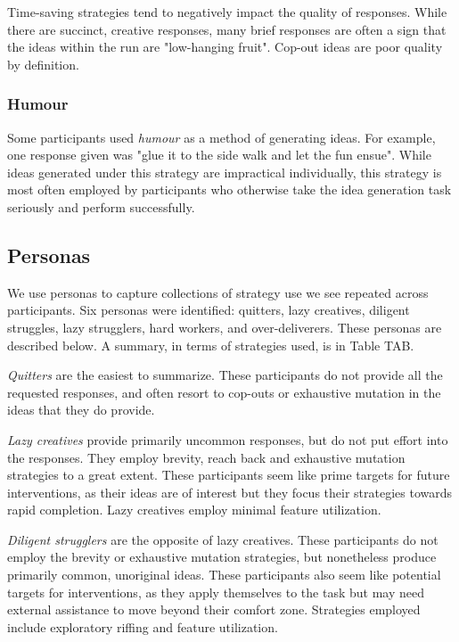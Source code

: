Time-saving strategies tend to negatively impact the quality of responses. While there are succinct, creative responses, many brief responses are often a sign that the ideas within the run are "low-hanging fruit". Cop-out ideas are poor quality by definition.

\subsubsection{Humour}

Some participants used \emph{humour} as a method of generating ideas. For example, one response given was "glue it to the side walk and let the fun ensue". While ideas generated under this strategy are impractical individually, this strategy is most often employed by participants who otherwise take the idea generation task seriously and perform successfully.

\subsection{Personas}

We use personas to capture collections of strategy use we see repeated across participants. 
Six personas were identified: quitters, lazy creatives, diligent struggles, lazy strugglers, hard workers, and over-deliverers. These personas are described below. A summary, in terms of strategies used, is in Table TAB.

\emph{Quitters} are the easiest to summarize. These participants do not provide all the requested responses, and often resort to cop-outs or exhaustive mutation in the ideas that they do provide.

\emph{Lazy creatives} provide primarily uncommon responses, but do not put effort into the responses. They employ brevity, reach back and exhaustive mutation strategies to a great extent. These participants seem like prime targets for future interventions, as their ideas are of interest but they focus their strategies towards rapid completion. Lazy creatives employ minimal feature utilization.

\emph{Diligent strugglers} are the opposite of lazy creatives. These participants do not employ the brevity or exhaustive mutation strategies, but nonetheless produce primarily common, unoriginal ideas. These participants also seem like potential targets for interventions, as they apply themselves to the task but may need external assistance to move beyond their comfort zone. Strategies employed include exploratory riffing and feature utilization.

